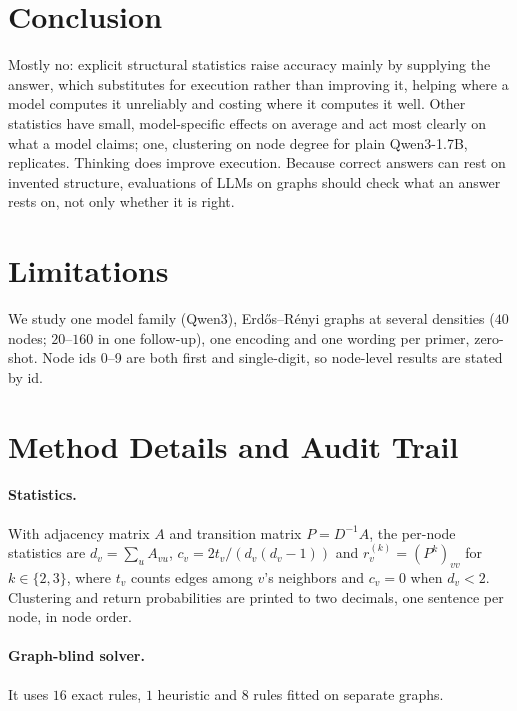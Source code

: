\documentclass[11pt]{article}
\begin{document}
\section{Conclusion}
\label{sec:conclusion}
Mostly no: explicit structural statistics raise accuracy mainly by supplying the answer, which substitutes for execution rather than improving it, helping where a model computes it unreliably and costing where it computes it well. Other statistics have small, model-specific effects on average and act most clearly on what a model claims; one, clustering on node degree for plain Qwen3-1.7B, replicates. Thinking does improve execution. Because correct answers can rest on invented structure, evaluations of LLMs on graphs should check what an answer rests on, not only whether it is right.

\section*{Limitations}
We study one model family (Qwen3), Erd\H{o}s--R\'enyi graphs at several densities ($40$ nodes; $20$--$160$ in one follow-up), one encoding and one wording per primer, zero-shot. Node ids 0--9 are both first and single-digit, so node-level results are stated by id.

\clearpage


\clearpage
\appendix
\raggedbottom
\makeatletter
\setlength{\@fptop}{0pt}
\setlength{\@dblfptop}{0pt}
\makeatother
\section{Method Details and Audit Trail}
\label{app:audit}

\paragraph{Statistics.} With adjacency matrix $A$ and transition matrix $P=D^{-1}A$, the per-node statistics are $d_v=\sum_u A_{vu}$, $c_v=2t_v/(d_v(d_v-1))$ and $r_v^{(k)}=(P^k)_{vv}$ for $k\in\{2,3\}$, where $t_v$ counts edges among $v$'s neighbors and $c_v=0$ when $d_v<2$. Clustering and return probabilities are printed to two decimals, one sentence per node, in node order.

\paragraph{Graph-blind solver.} It uses $16$ exact rules, $1$ heuristic and $8$ rules fitted on separate graphs. %
\end{document}
